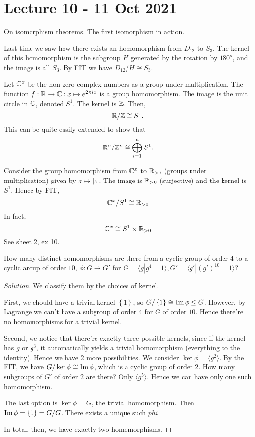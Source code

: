 \section{Lecture 10 - 11 Oct 2021}
On isomorphism theorems. The first isomorphism in action.

\begin{example}
  Last time we saw how there exists an homomorphism from $D_{12}$ to $S_3$. The kernel of
  this homomorphism is the subgroup $H$ generated by the rotation by $180^o$, and the
  image is all $S_3$. By FIT we have $D_{12}/H \cong S_3$.
\end{example}
\begin{example}
  Let $\mathbb C^x$ be the non-zero complex numbers as a group under multiplication. The
  function $f:\mathbb R\to\mathbb C:x\mapsto e^{2\pi i x}$ is a group homomorphism. The image is the
  unit circle in $\mathbb C$, denoted $S^1$. The kernel is $\mathbb Z$. Then,
  \[\mathbb R/\mathbb Z \cong S^1.\]
  This can be quite easily extended to show that 
  \[\mathbb R^n/\mathbb Z^n \cong \bigoplus_{i=1}^n S^1.\]
\end{example}

\begin{example}
  Consider the group homomorphism from $\mathbb C^x$ to $\mathbb R_{>0}$ (groups under
  multiplication) given by $z\mapsto |z|$. The image is $\mathbb R_{>0}$ (surjective) and the kernel is
  $S^1$. Hence by FIT,
  \[\mathbb C^x / S^1 \cong \mathbb R_{>0}\]
  In fact,
  \[\mathbb C^x \cong S^1 \times \mathbb R_{>0}\]
  See sheet 2, ex 10.
\end{example}
\begin{example}
  How many distinct homomorphisms are there from a cyclic group of order $4$ to a cyclic
  aroup of order $10$, $\phi:G\to G'$ for $G=\langle g|g^4=1\rangle,G'=\langle
  g'|(g')^{10}=1\rangle$?  
\end{example}
\begin{proof}[Solution]
  We classify them by the choices of kernel. 

  First, we chould have a trivial kernel $\left\{ 1 \right\}$, so $G/\left\{ 1 \right\}
  \cong \operatorname{Im}\phi \leq G$. However, by Lagrange we can't have a subgroup of order $4$ for
  $G$ of order $10$. Hence there're no homomorphisms for a trivial kernel.

  Second, we notice that there're exactly three possible kernels, since if the kernel has
  $g$ or $g^3$, it automatically yields a trivial homomorphism (everything to the
  identity). Hence we have 2 more possibilities. We consider $\ker\phi=\langle
  g^2\rangle$. By the FIT, we have $G/\ker\phi \cong \operatorname{Im}\phi$, which is a cyclic group of
  order 2. How many subgroups of $G'$ of order $2$ are there? Only $\langle
  g^5\rangle$. Hence we can have only one such homomorphism.

  The last option is $\ker\phi=G$, the trivial homomorphism. Then $\operatorname{Im}\phi=\left\{ 1
  \right\}= G/G$. There exists a unique such $phi$. 

  In total, then, we have exactly two homomorphisms.
\end{proof}

